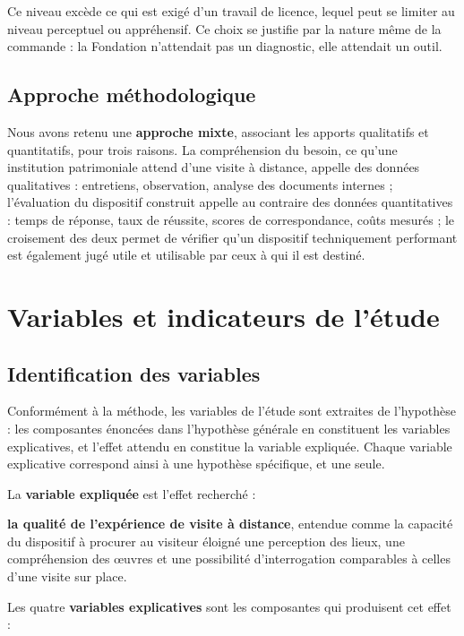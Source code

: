 Ce niveau excède ce qui est exigé d'un travail de licence, lequel peut se
limiter au niveau perceptuel ou appréhensif. Ce choix se justifie par la nature
même de la commande : la Fondation n'attendait pas un diagnostic, elle attendait
un outil.

\subsection{Approche méthodologique}

Nous avons retenu une \textbf{approche mixte}, associant les apports qualitatifs
et quantitatifs, pour trois raisons. La compréhension du besoin, ce qu'une institution patrimoniale attend d'une
visite à distance, appelle des données qualitatives : entretiens, observation,
analyse des documents internes ; l'évaluation du dispositif construit appelle
au contraire des données quantitatives : temps de réponse, taux de réussite,
scores de correspondance, coûts mesurés ; le croisement des deux permet de
vérifier qu'un dispositif techniquement performant est également jugé utile et
utilisable par ceux à qui il est destiné.

\section{Variables et indicateurs de l'étude}
\label{sec:variables}

\subsection{Identification des variables}

Conformément à la méthode, les variables de l'étude sont extraites de
l'hypothèse : les composantes énoncées dans l'hypothèse générale en constituent
les variables explicatives, et l'effet attendu en constitue la variable
expliquée. Chaque variable explicative correspond ainsi à une hypothèse
spécifique, et une seule.

La \textbf{variable expliquée} est l'effet recherché :

\textbf{la qualité de l'expérience de visite à distance}, entendue comme la
capacité du dispositif à procurer au visiteur éloigné une perception des
lieux, une compréhension des œuvres et une possibilité d'interrogation
comparables à celles d'une visite sur place.

Les quatre \textbf{variables explicatives} sont les composantes qui produisent
cet effet :

